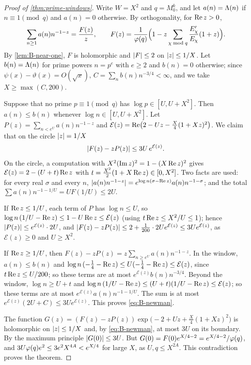 \begin{proof}[Proof of \cref{thm:prime-windows}]
Write $W=X^2$ and $q=M_0^k$, and let $a(n)=\Lambda(n)$ if $n\equiv1\pmod q$ and $a(n)=0$ otherwise. By
orthogonality, for $\operatorname{Re} z>0$,
\[
  \sum_{n\ge1}a(n)n^{-1-z}=\frac{F(z)}{z},\qquad
  F(z)=\frac{1}{\varphi(q)}\Bigl(1-z\sum_{\chi\bmod q}\frac{E_\chi'}{E_\chi}(1+z)\Bigr).
\]
By \cref{lem:B-near-one}, $F$ is holomorphic and $\lvert F\rvert\le2$ on $\lvert z\rvert\le1/X$. Let $b(n)=\Lambda(n)$
for prime powers $n=p^e$ with $e\ge2$ and $b(n)=0$ otherwise; since $\psi(x)-\vartheta(x)=O(\sqrt x)$,
$C=\sum_nb(n)n^{-3/4}<\infty$, and we take $X\ge\max(C,200)$.

Suppose that no prime $p\equiv1\pmod q$ has $\log p\in[U,U+X^2]$. Then $a(n)\le b(n)$ whenever
$\log n\in[U,U+X^2]$. Let $P(z)=\sum_{n<e^U}a(n)n^{-1-z}$ and
$\mathcal E(z)=\operatorname{Re}\bigl(2-Uz-\frac X4(1+Xz)^2\bigr)$. We claim that on the circle $\lvert z\rvert=1/X$
\begin{equation}\label{eq:B-newman}
  \lvert F(z)-zP(z)\rvert\le3U\,e^{\mathcal E(z)}.
\end{equation}
On the circle, a computation with $X^2(\operatorname{Im} z)^2=1-(X\operatorname{Re} z)^2$ gives
$\mathcal E(z)=2-(U+t)\operatorname{Re} z$ with $t=\frac{X^2}{2}(1+X\operatorname{Re} z)\in[0,X^2]$. Two facts are used: for every
real $\sigma$ and every $n$, $\lvert a(n)n^{-1-z}\rvert=e^{\log n(\sigma-\operatorname{Re} z)}a(n)n^{-1-\sigma}$; and the
total $\sum a(n)n^{-1-1/U}=UF(1/U)\le2U$.

If $\operatorname{Re} z\le1/U$, each term of $P$ has $\log n\le U$, so
$\log n\,(1/U-\operatorname{Re} z)\le1-U\operatorname{Re} z\le\mathcal E(z)$ (using $t\operatorname{Re} z\le X^2/U\le1$); hence
$\lvert P(z)\rvert\le e^{\mathcal E(z)}\cdot2U$, and
$\lvert F(z)-zP(z)\rvert\le2+\frac1{200}\cdot2Ue^{\mathcal E(z)}\le3Ue^{\mathcal E(z)}$, as
$\mathcal E(z)\ge0$ and $U\ge X^2$.

If $\operatorname{Re} z\ge1/U$, then $F(z)-zP(z)=z\sum_{n\ge e^U}a(n)n^{-1-z}$. In the window, $a(n)\le b(n)$ and
$\log n\,(-\frac14-\operatorname{Re} z)\le U(-\frac14-\operatorname{Re} z)\le\mathcal E(z)$, since $t\operatorname{Re} z\le U/200$; so these terms
are at most $e^{\mathcal E(z)}b(n)n^{-3/4}$. Beyond the window, $\log n\ge U+t$ and
$\log n\,(1/U-\operatorname{Re} z)\le(U+t)(1/U-\operatorname{Re} z)\le\mathcal E(z)$; so these terms are at most
$e^{\mathcal E(z)}a(n)n^{-1-1/U}$. The sum is at most $e^{\mathcal E(z)}(2U+C)\le3Ue^{\mathcal E(z)}$.
This proves \eqref{eq:B-newman}.

The function $G(z)=(F(z)-zP(z))\exp\bigl(-2+Uz+\frac X4(1+Xz)^2\bigr)$ is holomorphic on
$\lvert z\rvert\le1/X$ and, by \eqref{eq:B-newman}, at most $3U$ on its boundary. By the maximum principle
$\lvert G(0)\rvert\le3U$. But $G(0)=F(0)e^{X/4-2}=e^{X/4-2}/\varphi(q)$, and
$3U\varphi(q)e^2\le3e^2X^{4A}<e^{X/4}$ for large $X$, as $U,q\le X^{2A}$. This contradiction proves the
theorem.
\end{proof}

